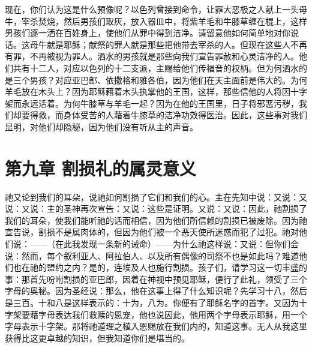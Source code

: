 现在，你们认为这是什么预像呢？以色列曾接到命令，让罪大恶极之人献上一头母牛，宰杀焚烧，然后男孩们取灰，放入器皿中，将紫羊毛和牛膝草缠在棍上，这样男孩们逐一洒在百姓身上，使他们从罪中得到洁净。请留意他如何简单地对你说话。这母牛就是耶稣；献祭的罪人就是那些把他带去宰杀的人。但现在这些人不再有罪，不再被视为罪人。洒水的男孩就是那些向我们宣告罪赦和心灵洁净的人。他们共有十二人，对应以色列的十二支派，主赐给他们传福音的权柄。但为何洒水的是三个男孩？对应亚巴郎、依撒格和雅各伯，因为他们在天主面前是伟大的。为何羊毛放在木头上？因为耶稣藉着木头执掌他的王国，这样，那些信他的人将因十字架而永远活着。为何牛膝草与羊毛一起？因为在他的王国里，日子将邪恶污秽，我们却要得救，而身体受苦的人藉着牛膝草的洁净功效得医治。因此，这些事对我们显明，对他们却隐秘，因为他们没有听从主的声音。\par


\section{第九章 割损礼的属灵意义}

祂又论到我们的耳朵，说祂如何割损了它们和我们的心。主在先知中说：又说：又说：又说：主的圣神再次宣告：又说：这些是证明。又说：又说：因此，祂割损了我们的耳朵，使我们能听祂的话而相信，因为他们所信赖的割损已被废除。因为祂宣告说，割损不是属肉体的，但因为他们被一个恶天使所迷惑而犯了过犯。祂对他们说：——（在此我发现一条新的诫命）——为什么祂这样说：又说：但你们会说：然而，每个叙利亚人、阿拉伯人、以及所有偶像的司祭不也是如此吗？难道他们也在祂的盟约之内？是的，连埃及人也施行割损。孩子们，请学习这一切丰盛的事：那首先吩咐割损的亚巴郎，因着在神视中预见耶稣，便行了此礼，领受了三个字母的奥秘。因为圣经说：那么，他在这事上得了什么知识呢？先学习十八，然后是三百。十和八是这样表示的：十为，八为。你便有了耶稣名字的首字。又因为十字架要藉字母表达我们救赎的恩宠，他也说因此，他用两个字母表示耶稣，用一个字母表示十字架。那将祂道理之植入恩赐放在我们内的，知道这事。无人从我这里获得比这更卓越的知识，但我知道你们是堪当的。\par

